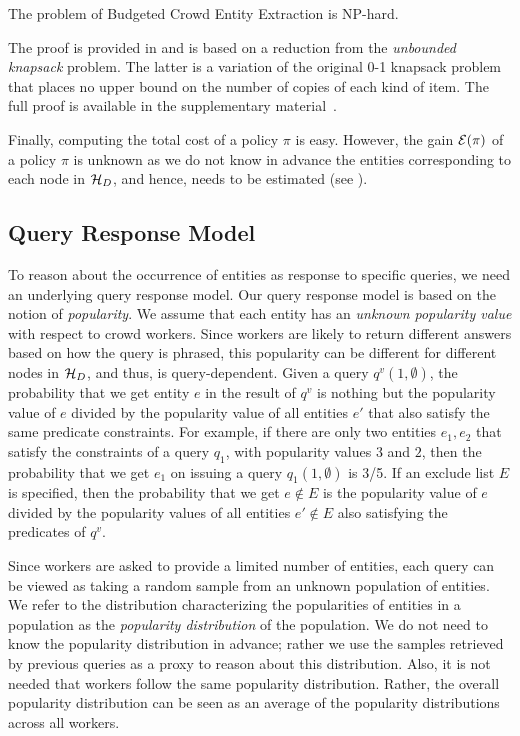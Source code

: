 \begin{theorem}[{\bf NP-Hardness}]
The problem of Budgeted Crowd Entity Extraction is NP-hard.
\end{theorem}
The proof is provided in  and is based on a reduction from the {\em unbounded knapsack} problem. The latter is a variation of the original 0-1 knapsack problem that places no upper bound on the number of copies of each kind of item. The full proof is available in the supplementary material~\cite{cruxsup}.

Finally, computing the total cost of a policy $\pi$ is easy. However, the gain $\mathcal{E}(\pi)$ of a policy $\pi$ is unknown as we do not know in advance the entities corresponding to each node in $\mathcal{H}_D$, and hence, needs to be estimated (see ). 

\subsection{Query Response Model}
\label{sec:sampling}
To reason about the occurrence of entities as response to specific queries, we need an underlying query response model. Our query response model is based on the notion of {\em popularity}. We assume that each entity has an {\em unknown popularity value} with respect to crowd workers. Since workers are likely to return different answers based on how the query is phrased, this popularity can be different for different nodes in $\mathcal{H}_D$, and thus, is query-dependent. 
Given a query $q^v(1, \emptyset)$, the probability that we get entity $e$ in the result of $q^v$ is nothing but the popularity value of $e$ divided by the popularity value of all entities $e'$ that also satisfy the same predicate constraints. For example, if there are only two entities $e_1, e_2$ that satisfy the constraints of a query $q_1$, with popularity values $3$ and $2$, then the probability that we get $e_1$ on issuing a query $q_1(1, \emptyset)$ is 3/5. If an exclude list $E$ is specified, then the probability that we get $e \notin E$ is the popularity value of $e$ divided by the popularity values of all entities $e' \notin E$ also satisfying the predicates of $q^v$. 

Since workers are asked to provide a limited number of entities, each query can be viewed as taking a random sample from an unknown population of entities. We refer to the distribution characterizing the popularities of entities in a population as the {\em popularity distribution} of the population. We do not need to know the popularity distribution in advance; rather we use the samples retrieved by previous queries as a proxy to reason about this distribution. Also, it is not needed that workers follow the same popularity distribution. Rather, the overall popularity distribution can be seen as an average of the popularity distributions across all workers.

